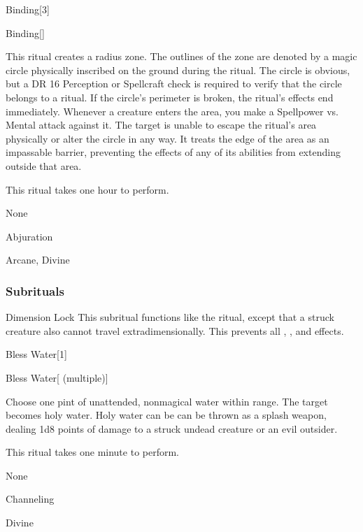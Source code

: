 \begin{spellsection}{Binding}[3]


\begin{ability}{Binding}[]

This ritual creates a \areasmall radius zone.
The outlines of the zone are denoted by a magic circle physically inscribed on the ground during the ritual.
The circle is obvious, but a DR 16 Perception or Spellcraft check is required to verify that the circle belongs to a  ritual.
If the circle's perimeter is broken, the ritual's effects end immediately.
Whenever a creature enters the area, you make a Spellpower vs. Mental attack against it.
\hit The target is unable to escape the ritual's area physically or alter the circle in any way.
It treats the edge of the area as an impassable barrier, preventing the effects of any of its abilities from extending outside that area.

This ritual takes one hour to perform.

\end{ability}


 None

 Abjuration

 Arcane, Divine
\end{spellsection}


\subsubsection{Subrituals}


\begin{ability}[\nth{5}]{Dimension Lock}
This subritual functions like the  ritual, except that a struck creature also cannot travel extradimensionally.
This prevents all , , and  effects.
\end{ability}
\vspace{0.25em}


\begin{spellsection}{Bless Water}[1]


\begin{ability}{Bless Water}[ (multiple)]

Choose one pint of unattended, nonmagical water within \rngclose range.
The target becomes holy water.
Holy water can be can be thrown as a splash weapon, dealing 1d8 points of damage to a struck undead creature or an evil outsider.

This ritual takes one minute to perform.

\end{ability}


 None

 Channeling

 Divine
\end{spellsection}


